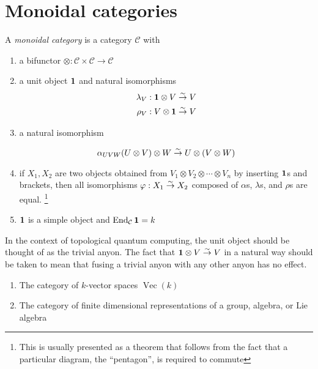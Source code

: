 \section{Monoidal categories}
\begin{defn}
    A \emph{monoidal category} is a category $\mathcal{C}$ with 
    \begin{enumerate}
    \renewcommand{\labelenumi}{\roman{enumi})}
        \item a bifunctor $\otimes: \mathcal{C} \times \mathcal{C} \to
            \mathcal{C}$
        \item a unit object $\mathbf{1}$ and natural isomorphisms
            \begin{align}
                \lambda_V &: \mathbf{1} \otimes V \overset{\sim}{\rightarrow} V \\
                \rho_V &: V \otimes \mathbf{1} \overset{\sim}{\rightarrow} V
            \end{align}
        \item a natural isomorphism 

            \begin{equation}
                \alpha_{UVW} (U \otimes V) \otimes W \overset{\sim}{\rightarrow} U \otimes (V \otimes W)
            \end{equation}

        \item if $X_1, X_2$ are two objects obtained from $V_1 \otimes V_2
            \otimes \cdots \otimes V_n$ by inserting $\mathbf{1}$s and brackets, then all
            isomorphisms $\varphi: X_1 \overset{\sim}{\rightarrow} X_2$ composed of $\alpha$s,
            $\lambda$s, and $\rho$s are equal. 
            \footnote{This is usually presented as a theorem that follows from
            the fact that a particular diagram, the ``pentagon'', is required to
            commute}
        \item $\mathbf{1}$ is a simple object and $\operatorname{End}_\mathcal{C} \mathbf{1} = k$
    \end{enumerate}

\end{defn}

In the context of topological quantum computing, the unit object should be
thought of as the trivial anyon. The fact that $\mathbf{1} \otimes V \overset{\sim}{\rightarrow} V$
in a natural way should be taken to mean that fusing a trivial anyon with any
other anyon has no effect.

\begin{example}
    \begin{enumerate}
    \renewcommand{\labelenumi}{\roman{enumi})}
        \item The category of $k$-vector spaces $\operatorname{Vec}(k)$
        \item The category of finite dimensional representations of a group, algebra, or Lie algebra
    \end{enumerate}
\end{example}

